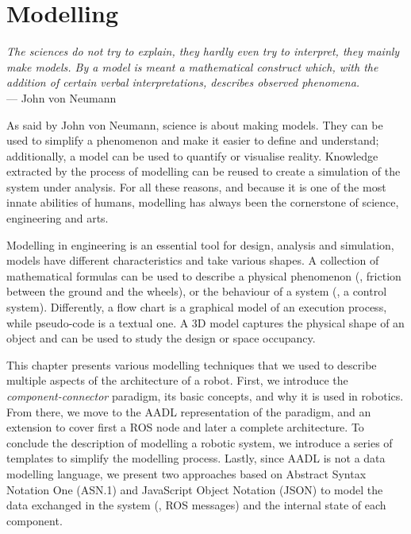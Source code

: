 \chapter[Modelling]{Modelling}\label{ch:Modelling}

\begin{flushright}{\slshape The sciences do not try to explain, they hardly even try to interpret, they mainly make models. By a model is meant a mathematical construct which, with the addition of certain verbal interpretations, describes observed phenomena.} \\ \medskip
    --- John  von Neumann
\end{flushright}

As said by John von Neumann, science is about making models. They can be used to simplify a phenomenon and make it easier to define and understand; additionally, a model can be used to quantify or visualise reality. Knowledge extracted by the process of modelling can be reused to create a simulation of the system under analysis. For all these reasons, and because it is one of the most innate abilities of humans, modelling has always been the cornerstone of science, engineering and arts.

Modelling in engineering is an essential tool for design, analysis and simulation, models have different characteristics and take various shapes. A collection of mathematical formulas can be used to describe a physical phenomenon (\eg, friction between the ground and the wheels), or the behaviour of a system (\eg, a control system). Differently, a flow chart is a graphical model of an execution process, while pseudo-code is a textual one. A 3D model captures the physical shape of an object and can be used to study the design or space occupancy.

This chapter presents various modelling techniques that we used to describe multiple aspects of the architecture of a robot. First, we introduce the \textit{component-connector} paradigm, its basic concepts, and why it is used in robotics. From there, we move to the AADL representation of the paradigm, and an extension to cover first a ROS node and later a complete architecture. To conclude the description of modelling a robotic system, we introduce a series of templates to simplify the modelling process. Lastly, since AADL is not a data modelling language, we present two approaches based on Abstract Syntax Notation One (ASN.1) and JavaScript Object Notation (JSON) to model the data exchanged in the system (\ie, ROS messages) and the internal state of each component.

